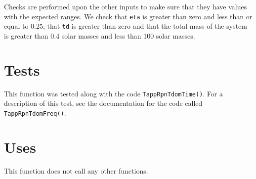 \documentclass[12pt]{article}
\begin{document}
Checks are performed upon the other inputs to make sure that they have values with the expected ranges. We check that \texttt{eta} is greater than zero and less than or equal to 0.25, that \texttt{td} is greater than zero and that the total mass of the system is greater than 0.4 solar masses and less than 100 solar masses.

\section{Tests}

This function was tested along with the code \texttt{TappRpnTdomTime()}. For a description of this test, see the documentation for the code called \texttt{TappRpnTdomFreq()}.

\section{Uses}

This function does not call any other functions.
\end{document}
